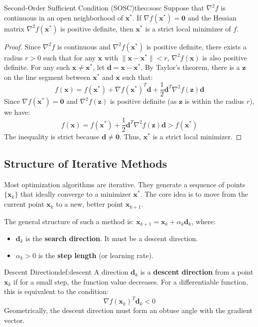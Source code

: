 \documentclass{MathNote}
\begin{document}
\begin{theorem}{Second-Order Sufficient Condition (SOSC)}{theo:sosc}
	Suppose that $\nabla^2 f$ is continuous in an open neighborhood of $\bm{x}^*$. If $\nabla f(\bm{x}^*) = \bm{0}$ and the Hessian matrix $\nabla^2 f(\bm{x}^*)$ is positive definite, then $\bm{x}^*$ is a strict local minimizer of $f$.
\end{theorem}
\begin{proof}
	Since $\nabla^2 f$ is continuous and $\nabla^2 f(\bm{x}^*)$ is positive definite, there exists a radius $r>0$ such that for any $\bm{x}$ with $\|\bm{x}-\bm{x}^*\| < r$, $\nabla^2 f(\bm{x})$ is also positive definite.
	For any such $\bm{x} \ne \bm{x}^*$, let $\bm{d} = \bm{x} - \bm{x}^*$. By Taylor's theorem, there is a $\bm{z}$ on the line segment between $\bm{x}^*$ and $\bm{x}$ such that:
	$$ f(\bm{x}) = f(\bm{x}^*) + \nabla f(\bm{x}^*)^T \bm{d} + \frac{1}{2} \bm{d}^T \nabla^2 f(\bm{z}) \bm{d} $$
	Since $\nabla f(\bm{x}^*) = \bm{0}$ and $\nabla^2 f(\bm{z})$ is positive definite (as $\bm{z}$ is within the radius $r$), we have:
	$$ f(\bm{x}) = f(\bm{x}^*) + \frac{1}{2} \bm{d}^T \nabla^2 f(\bm{z}) \bm{d} > f(\bm{x}^*) $$
	The inequality is strict because $\bm{d} \ne \bm{0}$. Thus, $\bm{x}^*$ is a strict local minimizer.
\end{proof}


\subsection{Structure of Iterative Methods}

Most optimization algorithms are iterative. They generate a sequence of points $\{\bm{x}_k\}$ that ideally converge to a minimizer $\bm{x}^*$. The core idea is to move from the current point $\bm{x}_k$ to a new, better point $\bm{x}_{k+1}$.

The general structure of such a method is: $\bm{x}_{k+1} = \bm{x}_k + \alpha_k \bm{d}_k$, where:
\begin{itemize}
	\item $\bm{d}_k$ is the \textbf{search direction}. It must be a descent direction.
	\item $\alpha_k > 0$ is the \textbf{step length} (or learning rate).
\end{itemize}

\begin{definition}{Descent Direction}{def:descent}
	A direction $\bm{d}_k$ is a \textbf{descent direction} from a point $\bm{x}_k$ if for a small step, the function value decreases. For a differentiable function, this is equivalent to the condition:
	$$ \nabla f(\bm{x}_k)^T \bm{d}_k < 0 $$
	Geometrically, the descent direction must form an obtuse angle with the gradient vector.
\end{definition}
\end{document}
